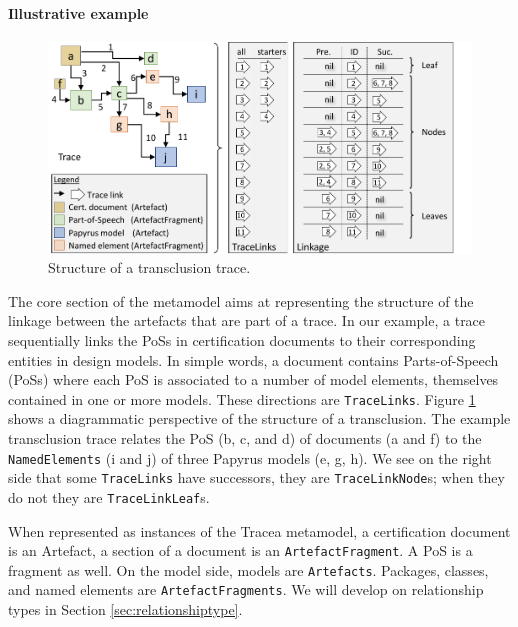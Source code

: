 \paragraph{Illustrative example}
\begin{figure}[h] 
	\centering
	\includegraphics[width=.85\linewidth]{images/core-re}
	\caption{Structure of a transclusion trace. }
	\label{fig:mm-core-instance}
\end{figure}
The core section of the metamodel aims at representing the structure of the linkage between the artefacts that are part of a trace. 
In our example, a trace sequentially links the PoSs in certification documents to their corresponding entities in design models. 
In simple words, a document contains Parts-of-Speech (PoSs) where each PoS is associated to a number of model elements, themselves contained in one or more models. These directions are \texttt{TraceLinks}. Figure \ref{fig:mm-core-instance} shows a diagrammatic perspective of the structure of a transclusion. The example transclusion trace relates the PoS (b, c, and d) of documents (a and f) to the \texttt{NamedElements} (i and j) of three Papyrus models (e, g, h). 
We see on the right side that some \texttt{TraceLinks} have successors, they are \texttt{TraceLinkNode}s; when they do not they are \texttt{TraceLinkLeaf}s. 

When represented as instances of the Tracea metamodel, a certification document is an Artefact, a section of a document is an \texttt{ArtefactFragment}. A PoS is a fragment as well. On the model side, models are \texttt{Artefacts}. Packages, classes, and named elements are \texttt{ArtefactFragments}. We will develop on relationship types in Section \ref{sec:relationshiptype}. 



